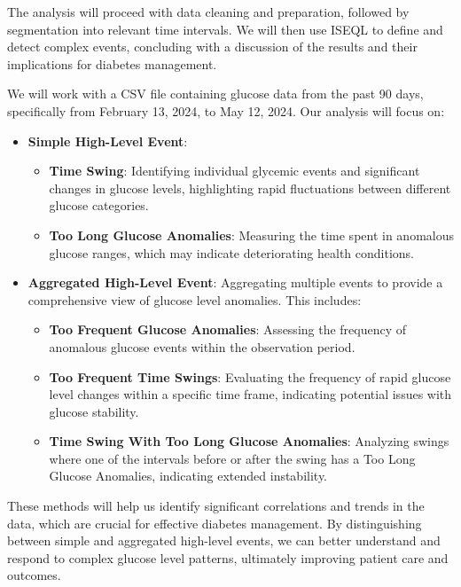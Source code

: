 \documentclass{article}
\begin{document}
The analysis will proceed with data cleaning and preparation, followed by segmentation into relevant time intervals. We will then use ISEQL to define and detect complex events, concluding with a discussion of the results and their implications for diabetes management.

We will work with a CSV file containing glucose data from the past 90 days, specifically from February 13, 2024, to May 12, 2024. Our analysis will focus on:

\begin{itemize}
    \item \textbf{Simple High-Level Event}:
        \begin{itemize}
            \item \textbf{Time Swing}: Identifying individual glycemic events and significant changes in glucose levels, highlighting rapid fluctuations between different glucose categories.
            \item \textbf{Too Long Glucose Anomalies}: Measuring the time spent in anomalous glucose ranges, which may indicate deteriorating health conditions.
        \end{itemize}
    \item \textbf{Aggregated High-Level Event}: Aggregating multiple events to provide a comprehensive view of glucose level anomalies. This includes:
    \begin{itemize}
        \item \textbf{Too Frequent Glucose Anomalies}: Assessing the frequency of anomalous glucose events within the observation period.
        \item \textbf{Too Frequent Time Swings}: Evaluating the frequency of rapid glucose level changes within a specific time frame, indicating potential issues with glucose stability.
        \item \textbf{Time Swing With Too Long Glucose Anomalies}: Analyzing swings where one of the intervals before or after the swing has a Too Long Glucose Anomalies, indicating extended instability.
    \end{itemize}
\end{itemize}

These methods will help us identify significant correlations and trends in the data, which are crucial for effective diabetes management. By distinguishing between simple and aggregated high-level events, we can better understand and respond to complex glucose level patterns, ultimately improving patient care and outcomes.
\end{document}
